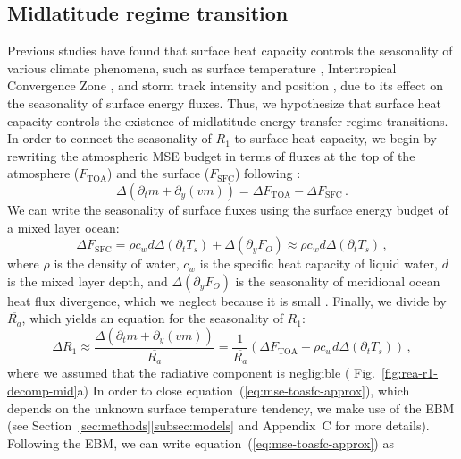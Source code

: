 \documentclass{ametsocV5}
\begin{document}
  \subsection{Midlatitude regime transition} \label{subsec:mld}
  Previous studies have found that surface heat capacity controls the seasonality of various climate phenomena, such as surface temperature \citep{donohoe2014}, Intertropical Convergence Zone \citep{bordoni2008}, and storm track intensity and position \citep{barpanda2020}, due to its effect on the seasonality of surface energy fluxes. Thus, we hypothesize that surface heat capacity controls the existence of midlatitude energy transfer regime transitions. In order to connect the seasonality of $R_1$ to surface heat capacity, we begin by rewriting the atmospheric MSE budget in terms of fluxes at the top of the atmosphere ($F_\mathrm{TOA}$) and the surface ($F_\mathrm{SFC}$) following \cite{barpanda2020}:
  \begin{equation}\label{eq:mse-toasfc}
    \Delta\left(\partial_t m + \partial_y (vm) \right) = \Delta F_{\mathrm{TOA}} - \Delta F_{\mathrm{SFC}} \, .
  \end{equation}
  We can write the seasonality of surface fluxes using the surface energy budget of a mixed layer ocean:
  \begin{equation}
    \Delta F_{\mathrm{SFC}} = \rho c_{w} d \Delta\left(\partial_t T_{s}\right) + \Delta ( \partial_y F_{O}) \approx \rho c_{w} d \Delta\left(\partial_t T_{s}\right) \, ,
  \end{equation}
  where $\rho$ is the density of water, $c_w$ is the specific heat capacity of liquid water, $d$ is the mixed layer depth, and $\Delta(\partial_y F_O)$ is the seasonality of meridional ocean heat flux divergence, which we neglect because it is small \citep{roberts2017}. Finally, we divide by $\overline{R_a}$, which yields an equation for the seasonality of $R_1$:
  \begin{equation}\label{eq:mse-toasfc-approx}
    \Delta R_1 \approx \frac{\Delta\left(\partial_t m + \partial_y (vm) \right)}{\overline{R_a}} = \frac{1}{\overline{R_a}} \left(\Delta F_{\mathrm{TOA}} - \rho c_{w} d \Delta\left(\partial_t T_{s}\right)\right) \, , 
  \end{equation}
  where we assumed that the radiative component is negligible ( Fig.~\ref{fig:rea-r1-decomp-mid}a) In order to close equation~(\ref{eq:mse-toasfc-approx}), which depends on the unknown surface temperature tendency, we make use of the EBM (see Section~\ref{sec:methods}\ref{subsec:models} and Appendix~C for more details). Following the EBM, we can write equation~(\ref{eq:mse-toasfc-approx}) as
\end{document}

